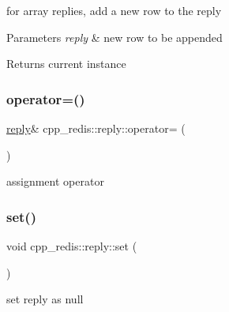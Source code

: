 for array replies, add a new row to the reply


\begin{DoxyParams}{Parameters}
{\em reply} & new row to be appended \\
\hline
\end{DoxyParams}
\begin{DoxyReturn}{Returns}
current instance 
\end{DoxyReturn}
\mbox{\label{classcpp__redis_1_1reply_a3482157af73f4a60a6386f057e484e5b}} 
\subsubsection{\texorpdfstring{operator=()}{operator=()}}
{\footnotesize\ttfamily \hyperlink{classcpp__redis_1_1reply}{reply}\& cpp\+\_\+redis\+::reply\+::operator= (\begin{DoxyParamCaption}\item[{const \hyperlink{classcpp__redis_1_1reply}{reply} \&}]{ }\end{DoxyParamCaption})\hspace{0.3cm}{\ttfamily [default]}}



assignment operator 

\mbox{\label{classcpp__redis_1_1reply_a2489d293128b2d567663a9d7fbbbc33e}} 
\subsubsection{\texorpdfstring{set()}{set()}\hspace{0.1cm}{\footnotesize\ttfamily [1/4]}}
{\footnotesize\ttfamily void cpp\+\_\+redis\+::reply\+::set (\begin{DoxyParamCaption}\item[{void}]{ }\end{DoxyParamCaption})}

set reply as null \mbox{\label{classcpp__redis_1_1reply_a9306dcc36a6a009a2b0f4923735f6349}} 
